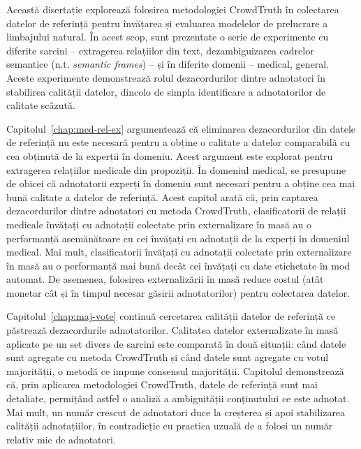 Această disertație explorează folosirea metodologiei CrowdTruth în colectarea datelor de referință pentru învățarea și evaluarea modelelor de prelucrare a limbajului natural. În acest scop, sunt prezentate o serie de experimente cu diferite sarcini -- extragerea relațiilor din text, dezambiguizarea cadrelor semantice (n.t. \textit{semantic frames}) -- și în diferite domenii -- medical, general. Aceste experimente demonstrează rolul dezacordurilor dintre adnotatori în stabilirea calității datelor, dincolo de simpla identificare a adnotatorilor de calitate scăzută.

Capitolul~\ref{chap:med-rel-ex} argumentează că eliminarea dezacordurilor din datele de referință nu este necesară pentru a obține o calitate a datelor comparabilă cu cea obținută de la experții în domeniu. Acest argument este explorat pentru extragerea relațiilor medicale din propoziții. În domeniul medical, se presupune de obicei că adnotatorii experți în domeniu sunt necesari pentru a obține cea mai bună calitate a datelor de referință. Acest capitol arată că, prin captarea dezacordurilor dintre adnotatori cu metoda CrowdTruth, clasificatorii de relații medicale învățați cu adnotații colectate prin externalizare în masă au o performanță asemănătoare cu cei învățați cu adnotații de la experți în domeniul medical. Mai mult, clasificatorii învățați cu adnotații colectate prin externalizare în masă au o performanță mai bună decât cei învățați cu date etichetate în mod automat. De asemenea, folosirea externalizării în masă reduce costul (atât monetar cât și în timpul necesar găsirii adnotatorilor) pentru colectarea datelor.

Capitolul~\ref{chap:maj-vote} continuă cercetarea calității datelor de referință ce păstrează dezacordurile adnotatorilor. Calitatea datelor externalizate în masă aplicate pe un set divers de sarcini este comparată în două situații: când datele sunt agregate cu metoda CrowdTruth și când datele sunt agregate cu votul majorității, o metodă ce impune consensul majorității. Capitolul demonstrează că, prin aplicarea metodologiei CrowdTruth, datele de referință sunt mai detaliate, permițând astfel o analiză a ambiguității conținutului ce este adnotat. Mai mult, un număr crescut de adnotatori duce la creșterea și apoi stabilizarea calității adnotațiilor, în contradicție cu practica uzuală de a folosi un număr relativ mic de adnotatori.

